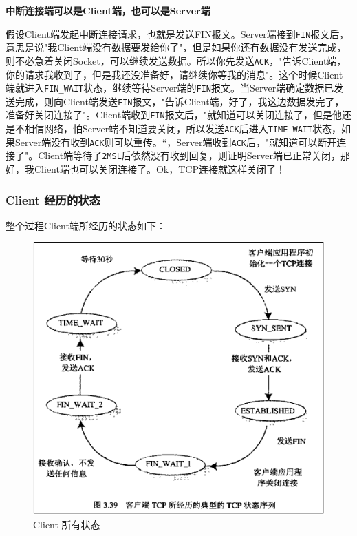 \documentclass[UTF8,a4paper,8pt]{ctexbook}
\begin{document}
			\textbf{中断连接端可以是Client端，也可以是Server端}
			
			假设Client端发起中断连接请求，也就是发送FIN报文。Server端接到\verb|FIN|报文后，意思是说"我Client端没有数据要发给你了"，但是如果你还有数据没有发送完成，则不必急着关闭Socket，可以继续发送数据。所以你先发送\verb|ACK|，"告诉Client端，你的请求我收到了，但是我还没准备好，请继续你等我的消息"。这个时候Client端就进入\verb|FIN_WAIT|状态，继续等待Server端的\verb|FIN|报文。当Server端确定数据已发送完成，则向Client端发送\verb|FIN|报文，"告诉Client端，好了，我这边数据发完了，准备好关闭连接了"。Client端收到\verb|FIN|报文后，"就知道可以关闭连接了，但是他还是不相信网络，怕Server端不知道要关闭，所以发送\verb|ACK|后进入\verb|TIME_WAIT|状态，如果Server端没有收到\verb|ACK|则可以重传。“，Server端收到\verb|ACK|后，"就知道可以断开连接了"。Client端等待了\verb|2MSL|后依然没有收到回复，则证明Server端已正常关闭，那好，我Client端也可以关闭连接了。Ok，TCP连接就这样关闭了！
			
			\subsubsection{Client 经历的状态}
				整个过程Client端所经历的状态如下：
				\begin{figure}[ht]
					\centering
					\includegraphics[scale = 0.7]{Client-status.png}
					\caption{Client 所有状态}
					\label{clientStatus}
				\end{figure}
			
\end{document}
